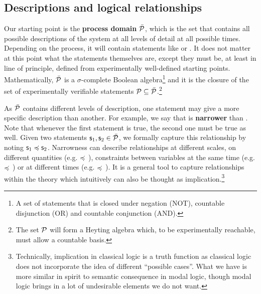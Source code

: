 \documentclass[letterpaper]{article}
\begin{document}
\subsection{Descriptions and logical relationships}

Our starting point is the \textbf{process domain} $\tdomain[P]$, which is the set that contains all possible descriptions of the system at all levels of detail at all possible times. Depending on the process, it will contain statements like  or . It does not matter at this point what the statements themselves are, except they must be, at least in line of principle, defined from experimentally well-defined starting points. Mathematically, $\tdomain[P]$ is a $\sigma$-complete Boolean algebra\footnote{A set of statements that is closed under negation (NOT), countable disjunction (OR) and countable conjunction (AND).} and it is the closure of the set of experimentally verifiable statements $\edomain[P] \subseteq \tdomain[P]$.\footnote{The set $\edomain[P]$ will form a Heyting algebra which, to be experimentally reachable, must allow a countable basis.}

As $\tdomain[P]$ contains different levels of description, one statement may give a more specific description than another. For example, we say that  is \textbf{narrower} than . Note that whenever the first statement is true, the second one must be true as well. Given two statements $\stmt_1, \stmt_2 \in \tdomain[P]$, we formally capture this relationship by noting $\stmt_1 \narrower \stmt_2$. Narrowness can describe relationships at different scales, on different quantities (e.g.  $\narrower$ ), constraints between variables at the same time (e.g.  $\narrower$ ) or at different times (e.g.  $\narrower$ ). It is a general tool to capture relationships within the theory which intuitively can also be thought as implication.\footnote{Technically, implication in classical logic is a truth function as classical logic does not incorporate the idea of different ``possible cases''. What we have is more similar in spirit to semantic consequence in modal logic, though modal logic brings in a lot of undesirable elements we do not want.}
\end{document}
